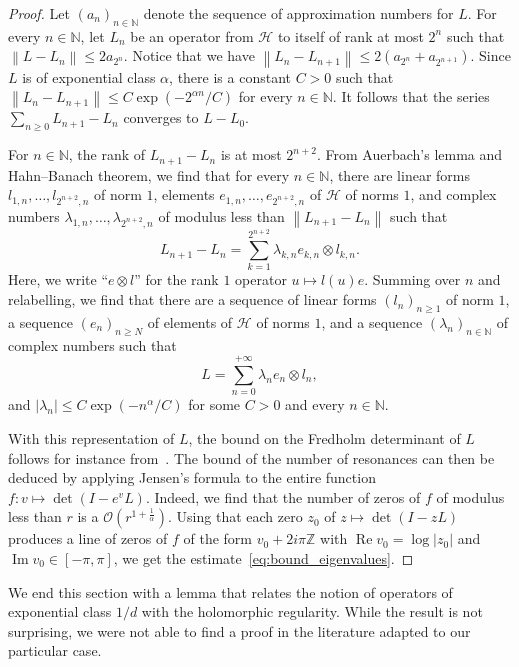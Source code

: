 \documentclass[10pt]{amsart}
\theoremstyle{definition}\newtheorem{defi}[theo]{Definition}\newtheorem{rema}[theo]{Remark}\newtheorem{exam}[theo]{Example}\newtheorem{exem}[theo]{Example}\newtheorem{nota}[theo]{Notation}
\DeclareMathOperator{\im}{Im}
\DeclareMathOperator{\re}{Re}
\newcommand{\n}[1]{\left\|#1\right\|}
\newcommand{\clO}{\mathcal{O}}
\newcommand{\clH}{\mathcal{H}}
\newcommand{\bbZ}{\mathbb{Z}}
\newcommand{\bbN}{\mathbb{N}}
\begin{document}
\begin{proof}
Let $(a_n)_{n \in \bbN}$ denote the sequence of approximation numbers for $L$. For every $n \in \bbN$, let $L_n$ be an operator from $\clH$ to itself of rank at most $2^n$ such that $\n{L - L_n} \leq 2 a_{2^n}$. Notice that we have $\n{L_n - L_{n+1}} \leq 2 (a_{2^n} + a_{2^{n+1}})$. Since $L$ is of exponential class $\alpha$, there is a constant $C > 0$ such that $\n{L_n - L_{n+1}} \leq C \exp(- 2^{\alpha n}/C)$ for every $n \in \bbN$. It follows that the series $\sum_{n \geq 0} L_{n+1} - L_{n}$ converges to $L - L_0$.

For $n \in \bbN$, the rank of $L_{n+1} - L_n$ is at most $2^{n+2}$. From Auerbach's lemma and Hahn--Banach theorem, we find that for every $n \in \bbN$, there are linear forms $l_{1,n}, \dots, l_{2^{n+2},n}$ of norm $1$, elements $e_{1,n},\dots,e_{2^{n+2},n}$ of $\clH$ of norms $1$, and complex numbers $\lambda_{1,n}, \dots, \lambda_{2^{n+2},n}$ of modulus less than $\n{L_{n+1} - L_n}$ such that
\begin{equation*}
L_{n+1} - L_n = \sum_{k = 1}^{2^{n+2}} \lambda_{k,n} e_{k,n} \otimes l_{k,n}.
\end{equation*}
Here, we write ``$e \otimes l$'' for the rank $1$ operator $u \mapsto l(u) e$. Summing over $n$ and relabelling, we find that there are a sequence of linear forms $(l_n)_{n \geq 1}$ of norm $1$, a sequence $(e_n)_{n \geq N}$ of elements of $\clH$ of norms $1$, and a sequence $(\lambda_n)_{n \in \bbN}$ of complex numbers such that
\begin{equation*}
L = \sum_{n = 0}^{+ \infty} \lambda_n e_n \otimes l_n,
\end{equation*}
and $|\lambda_n| \leq C \exp(- n^\alpha/C)$ for some $C > 0$ and every $n \in \bbN$.

With this representation of $L$, the bound on the Fredholm determinant of $L$ follows for instance from~\cite[Lemma~2.13]{local_and_global}. The bound of the number of resonances can then be deduced by applying Jensen's formula to the entire function $f : v \mapsto \det(I - e^v L)$. Indeed, we find that the number of zeros of $f$ of modulus less than $r$ is a $\clO(r^{1 + \frac{1}{\alpha}})$. Using that each zero $z_0$ of $z \mapsto \det(I - zL)$ produces a line of zeros of $f$ of the form $v_0 + 2i \pi \bbZ$ with $\re v_0 = \log |z_0|$ and $\im v_0 \in [-\pi,\pi]$, we get the estimate~\eqref{eq:bound_eigenvalues}.
\end{proof}

We end this section with a lemma that relates the notion of operators of exponential class $1/d$ with the holomorphic regularity. While the result is not surprising, we were not able to find a proof in the literature adapted to our particular case.
\end{document}
